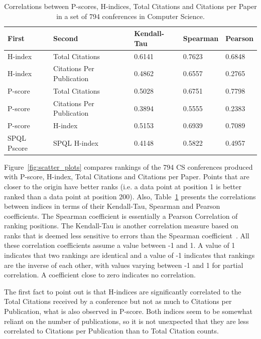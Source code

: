 \documentclass[notitlepage]{svjour3}
\begin{document}
\begin{table}[ht!]
  \small
  \centering
  \begin{tabular}{lllll} 
  \toprule
  First & Second & Kendall-Tau & Spearman & Pearson \\ 
  \midrule
  H-index     & Total Citations           & 0.6141 & 0.7623 & 0.6848 \\
  H-index     & Citations Per Publication & 0.4862 & 0.6557 & 0.2765 \\
  P-score     & Total Citations           & 0.5028 & 0.6751 & 0.7798 \\
  P-score     & Citations Per Publication & 0.3894 & 0.5555 & 0.2383 \\
  P-score     & H-index                   & 0.5153 & 0.6939 & 0.7089 \\
  SPQL Pscore & SPQL H-index              & 0.4148 & 0.5822 & 0.4957 \\
  \bottomrule
  \end{tabular}
  \caption{Correlations between P-scores, H-indices, Total Citations 
  and Citations per Paper in a set of 794 conferences in Computer Science.}
  \label{tab:correlations}
\end{table}

Figure~\ref{fig:scatter_plots} compares rankings of the 794 CS conferences produced with
P-score, H-index, Total Citations and Citations per Paper.
Points that are closer to the origin have better ranks (i.e. a data point at position 1 is 
better ranked than a data point at position 200). Also, Table~\ref{tab:correlations} presents the
correlations between indices in terms of their Kendall-Tau, Spearman and Pearson coefficients.
The Spearman coefficient is essentially a Pearson Correlation of ranking positions. The
Kendall-Tau is another correlation measure based on ranks that is deemed less
sensitive to errors than the Spearman coefficient~\cite{Kendall1955,Baeza-Yates2011}. All these 
correlation coefficients assume a value between -1 and 1. A value of 1 indicates that two rankings are 
identical and a value of -1 indicates that rankings are the inverse of each other, with values varying 
between -1 and 1 for partial correlation. A coefficient close to zero indicates no correlation.

The first fact to point out is that H-indices are significantly correlated to the Total Citations
received by a conference but not as much to Citations per Publication,
what is also observed in P-score. Both indices seem to be somewhat reliant on the number of 
publications, so it is not unexpected that they are less correlated to Citations per Publication
than to Total Citation counts. 
\end{document}
